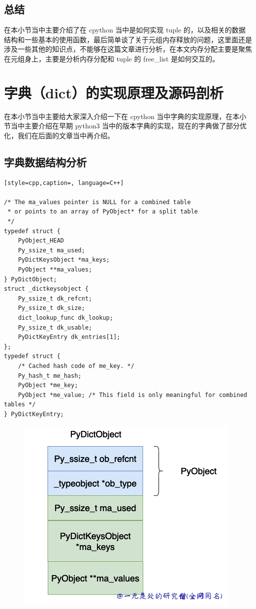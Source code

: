 \subsection{总结}
在本小节当中主要介绍了在 cpython 当中是如何实现 tuple 的，以及相关的数据结构和一些基本的使用函数，最后简单谈了关于元组内存释放的问题，这里面还是涉及一些其他的知识点，不能够在这篇文章进行分析，在本文内存分配主要是聚焦在元组身上，主要是分析内存分配和 tuple 的 free\_list 是如何交互的。


\section{字典（dict）的实现原理及源码剖析}
在本小节当中主要给大家深入介绍一下在 cpython 当中字典的实现原理，在本小节当中主要介绍在早期 python3 当中的版本字典的实现，现在的字典做了部分优化，我们在后面的文章当中再介绍。
\subsection{字典数据结构分析}
\begin{lstlisting}[style=cpp,caption=, language=C++]

/* The ma_values pointer is NULL for a combined table
 * or points to an array of PyObject* for a split table
 */
typedef struct {
    PyObject_HEAD
    Py_ssize_t ma_used;
    PyDictKeysObject *ma_keys;
    PyObject **ma_values;
} PyDictObject;
struct _dictkeysobject {
    Py_ssize_t dk_refcnt;
    Py_ssize_t dk_size;
    dict_lookup_func dk_lookup;
    Py_ssize_t dk_usable;
    PyDictKeyEntry dk_entries[1];
};
typedef struct {
    /* Cached hash code of me_key. */
    Py_hash_t me_hash;
    PyObject *me_key;
    PyObject *me_value; /* This field is only meaningful for combined tables */
} PyDictKeyEntry;
\end{lstlisting}

    \begin{figure}[H]
        \centering
            \includegraphics[scale=.3]{images/26-dict.png}
            \caption{ }
        \label{fig:my_label}
    \end{figure}
    
